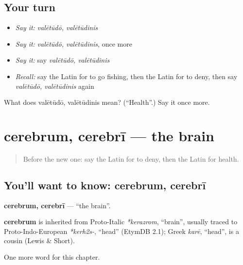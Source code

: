 \subsection*{Your turn}
\begin{itemize}
\raggedright
  \item \emph{Say it:} \emph{valētūdō, valētūdinis}
  \item \emph{Say it:} \emph{valētūdō, valētūdinis}, once more
  \item \emph{Say it:} say \emph{valētūdō, valētūdinis}
  \item \emph{Recall:} say the Latin for to go fishing, then the Latin for to deny, then say \emph{valētūdō, valētūdinis} again
\end{itemize}

\begin{tcolorbox}[breakable,colback=teal!4,colframe=teal!35!black,title={Before you move on}]
What does valētūdō, valētūdinis mean? (\textquotedblleft{}Health\textquotedblright{}.) Say it once more.
\end{tcolorbox}
\section[cerebrum, cerebrī]{cerebrum, cerebrī — the brain}

\label{lesson:LA-C173-cerebrum}



\begin{quote}
Before the new one: say the Latin for to deny, then the Latin for health.
\end{quote}

\subsection*{You'll want to know: cerebrum, cerebrī}
\textbf{cerebrum, cerebrī} — \textquotedblleft{}the brain\textquotedblright{}.

\begin{cousinweb}
\textbf{cerebrum} is inherited from Proto-Italic \emph{*kerazrom}, \textquotedblleft{}brain\textquotedblright{}, usually traced to Proto-Indo-European \emph{*kerh2s-}, \textquotedblleft{}head\textquotedblright{} (EtymDB 2.1); Greek \emph{karē}, \textquotedblleft{}head\textquotedblright{}, is a cousin (Lewis \& Short).
\end{cousinweb}

\begin{grammarlens}[title={What you've built}]
One more word for this chapter.
\end{grammarlens}

